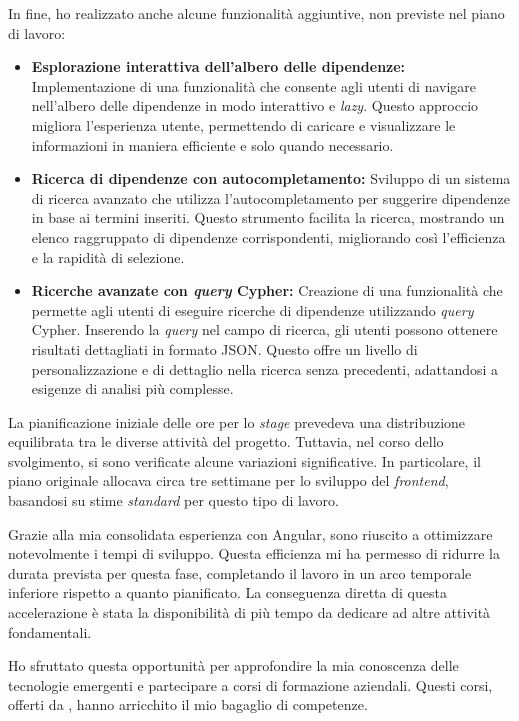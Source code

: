\noindent In fine, ho realizzato anche alcune funzionalità aggiuntive, non previste nel piano di lavoro:
\begin{itemize}
  \item \textbf{Esplorazione interattiva dell'albero delle dipendenze:} Implementazione di una funzionalità che consente 
  agli utenti di navigare nell'albero delle dipendenze in modo interattivo e \textit{lazy}. 
  Questo approccio migliora l'esperienza utente, permettendo di caricare e visualizzare le informazioni in maniera 
  efficiente e solo quando necessario.
  \item \textbf{Ricerca di dipendenze con autocompletamento:} Sviluppo di un sistema di ricerca avanzato che utilizza 
  l'autocompletamento per suggerire dipendenze in base ai termini inseriti. 
  Questo strumento facilita la ricerca, mostrando un elenco raggruppato di dipendenze corrispondenti,
   migliorando così l'efficienza e la rapidità di selezione.
  \item \textbf{Ricerche avanzate con \textit{query} Cypher:} Creazione di una funzionalità che permette agli utenti di eseguire 
  ricerche di dipendenze utilizzando \textit{query} Cypher. Inserendo la \textit{query} nel campo di ricerca, 
  gli utenti possono ottenere risultati dettagliati in formato JSON. Questo offre un livello di personalizzazione e di 
  dettaglio nella ricerca senza precedenti, adattandosi a esigenze di analisi più complesse.
  \end{itemize}
La pianificazione iniziale delle ore per lo \textit{stage} prevedeva una distribuzione equilibrata tra le diverse attività del progetto. 
Tuttavia, nel corso dello svolgimento, 
si sono verificate alcune variazioni significative. In particolare, il piano originale allocava circa tre settimane per lo sviluppo 
del \textit{frontend}, basandosi su stime \textit{standard} per questo tipo di lavoro.

Grazie alla mia consolidata esperienza con Angular, sono riuscito a ottimizzare notevolmente i tempi di sviluppo. 
Questa efficienza mi ha permesso di ridurre la durata prevista per questa fase, completando il lavoro in un arco temporale 
inferiore rispetto a quanto pianificato. La conseguenza diretta di questa accelerazione è stata la disponibilità di più 
tempo da dedicare ad altre attività fondamentali.

Ho sfruttato questa opportunità per approfondire la mia conoscenza delle tecnologie emergenti e partecipare a corsi di 
formazione aziendali. Questi corsi, offerti da \azienda{}, hanno arricchito il mio bagaglio di competenze.
